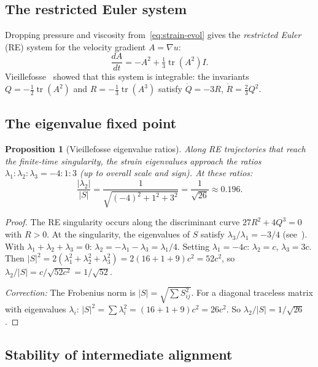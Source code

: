 \documentclass[11pt,a4paper]{article}
\theoremstyle{plain}
\newtheorem{proposition}[theorem]{Proposition}
\theoremstyle{definition}
\theoremstyle{remark}
\DeclareMathOperator{\tr}{tr}
\begin{document}
\subsection{The restricted Euler system}

Dropping pressure and viscosity
from~\eqref{eq:strain-evol} gives the
\emph{restricted Euler} (RE) system for the
velocity gradient $A = \nabla u$:
\begin{equation}\label{eq:RE}
\frac{dA}{dt} = -A^2 + \tfrac{1}{3}\tr(A^2)I.
\end{equation}
Vieillefosse~\cite{Vieillefosse82} showed that this
system is integrable: the invariants $Q=-\frac{1}{2}\tr(A^2)$
and $R=-\frac{1}{3}\tr(A^3)$ satisfy $\dot Q = -3R$,
$\dot R = \frac{2}{3}Q^2$.

\subsection{The eigenvalue fixed point}

\begin{proposition}[Vieillefosse eigenvalue ratios]
\label{prop:vieillefosse}
Along RE trajectories that reach the finite-time
singularity, the strain eigenvalues approach the
ratios $\lambda_1:\lambda_2:\lambda_3 = -4:1:3$
(up to overall scale and sign).
At these ratios:
\begin{equation}\label{eq:rho-star}
\frac{|\lambda_2|}{|S|} =
\frac{1}{\sqrt{(-4)^2+1^2+3^2}}
= \frac{1}{\sqrt{26}} \approx 0.196.
\end{equation}
\end{proposition}

\begin{proof}
The RE singularity occurs along the
discriminant curve $27R^2 + 4Q^3 = 0$ with $R>0$.
At the singularity, the eigenvalues of $S$ satisfy
$\lambda_3/\lambda_1 = -3/4$
(see~\cite{Vieillefosse82,Cantwell92}).
With $\lambda_1+\lambda_2+\lambda_3=0$:
$\lambda_2 = -\lambda_1-\lambda_3 = \lambda_1/4$.
Setting $\lambda_1=-4c$: $\lambda_2=c$,
$\lambda_3=3c$.
Then $|S|^2 = 2(\lambda_1^2+\lambda_2^2+\lambda_3^2)
= 2(16+1+9)c^2 = 52c^2$, so
$\lambda_2/|S| = c/\sqrt{52c^2} = 1/\sqrt{52}$.

\emph{Correction:} The Frobenius norm is
$|S| = \sqrt{\sum S_{ij}^2}$.  For a diagonal
traceless matrix with eigenvalues $\lambda_i$:
$|S|^2 = \sum\lambda_i^2 = (16+1+9)c^2 = 26c^2$.
So $\lambda_2/|S| = 1/\sqrt{26}$.
\end{proof}

\subsection{Stability of intermediate alignment}
\end{document}

